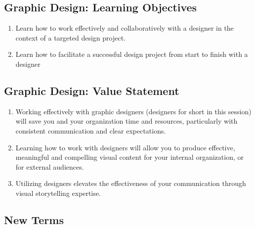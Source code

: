 \documentclass[
]{book}
\providecommand{\tightlist}{%
  \setlength{\itemsep}{0pt}\setlength{\parskip}{0pt}}
\begin{document}
\hypertarget{graphic-design-learning-objectives-1}{%
\subsection{Graphic Design: Learning Objectives}\label{graphic-design-learning-objectives-1}}

\begin{enumerate}
\def\labelenumi{\arabic{enumi}.}
\tightlist
\item
  Learn how to work effectively and collaboratively with a designer in the context of a targeted design project.
\item
  Learn how to facilitate a successful design project from start to finish with a designer
\end{enumerate}

\hypertarget{graphic-design-value-statement-1}{%
\subsection{Graphic Design: Value Statement}\label{graphic-design-value-statement-1}}

\begin{enumerate}
\def\labelenumi{\arabic{enumi}.}
\tightlist
\item
  Working effectively with graphic designers (designers for short in this session) will save you and your organization time and resources, particularly with consistent communication and clear expectations.
\item
  Learning how to work with designers will allow you to produce effective, meaningful and compelling visual content for your internal organization, or for external audiences.
\item
  Utilizing designers elevates the effectiveness of your communication through visual storytelling expertise.
\end{enumerate}

\hypertarget{new-terms-1}{%
\subsection{New Terms}\label{new-terms-1}}
\end{document}
